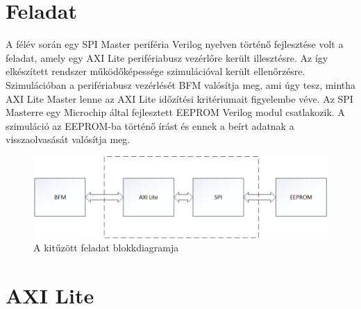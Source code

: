\documentclass[a4paper,11pt]{article}
\begin{document}
\section{Feladat}
A félév során egy SPI Master periféria Verilog nyelven történő fejlesztése volt a feladat, amely egy AXI Lite perifériabusz vezérlőre került illesztésre. Az így elkészített rendszer működőképessége szimulációval került ellenőrzésre. Szimulációban a perifériabusz vezérlését BFM valósítja meg, ami úgy tesz, mintha AXI Lite Master lenne az AXI Lite időzítési kritériumait figyelembe véve. Az SPI Masterre egy Microchip által fejlesztett EEPROM Verilog modul csatlakozik. A szimuláció az EEPROM-ba történő írást és ennek a beírt adatnak a visszaolvasását valósítja meg.
\begin{figure}[h!]
	\begin{center}
	\includegraphics[scale=0.7]{genbd.png}
	\caption{A kitűzött feladat blokkdiagramja}
	\label{fig:genbd}
	\end{center}
\end{figure}

\section{AXI Lite}
\end{document}
